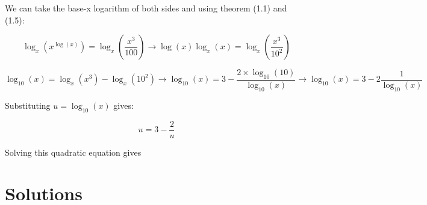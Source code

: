 \begin{solution}
We can take the base-x logarithm of both sides and using theorem (1.1) and (1.5):

$$
  \log_x(x^{\log(x)}) = \log_x(\frac{x^3}{100}) 
  \rightarrow 
  \log(x)\log_x(x) = \log_x(\frac{x^3}{10^2})
$$

$$
  \log_{10}(x) = \log_x(x^3)-\log_x(10^2)
  \rightarrow
  \log_{10}(x) = 3-\frac{2 \times \log_{10}(10)}{\log_{10}(x)}
  \rightarrow
  \log_{10}(x) = 3-2\frac{1}{\log_{10}(x)}
$$

Substituting $u=\log_{10}(x)$ gives:

$$ u = 3-\frac{2}{u} $$

Solving this quadratic equation gives 

\end{solution}



\newpage
\section{Solutions}


\printsolutions